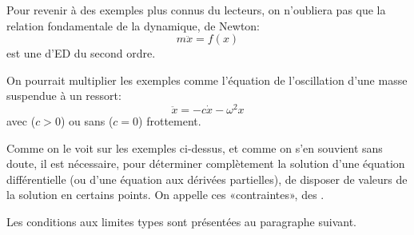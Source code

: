 \medskip
Pour revenir à des exemples plus connus du lecteurs, on n'oubliera pas que
la relation fondamentale de la dynamique, de Newton: \begin{equation} %
m\ddot{x}=f(x)\end{equation}%
est une d'ED du second ordre.

On pourrait multiplier les exemples comme l'équation de l'oscillation d'une masse
suspendue à un ressort: \begin{equation}%
\ddot{x} = - c \dot{x} - \omega^2x \end{equation}%
avec ($c>0$) ou sans ($c=0$) frottement.

\medskip
Comme on le voit sur les exemples ci-dessus, et comme on s'en souvient sans doute,
il est nécessaire, pour déterminer complètement la solution d'une équation différentielle (ou d'une équation aux dérivées partielles),
de disposer de valeurs de la solution en certains points.
On appelle ces «contraintes», des .

Les conditions aux limites types sont présentées au paragraphe suivant.


